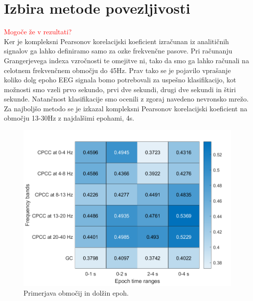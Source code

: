 \section{Izbira metode povezljivosti}
\textcolor{red}{Mogoče že v rezultati?}\\
Ker je kompleksni Pearsonov korelacijski koeficient izračunan iz analitičnih signalov ga lahko definiramo samo za ozke frekvenčne pasove. Pri računanju Grangerjevega indexa vzročnosti te omejitve ni, tako da smo ga lahko računali na celotnem frekvenčnem območju do 45Hz. Prav tako se je pojavilo vprašanje koliko dolg epoho EEG signala bomo potrebovali za uspešno klasifikacijo, kot možnosti smo vzeli prvo sekundo, prvi dve sekundi, drugi dve sekundi in štiri sekunde. Natančnost klasifikacije smo ocenili z zgoraj navedeno nevronsko mrežo. Za najboljšo metodo se je izkazal kompleksni Pearsonov korelacijski koeficient na območju 13-30Hz z najdalšimi epohami, 4s.
\begin{figure}[h!]
    \begin{center}
    \includegraphics[width=0.5\linewidth]{slike/Comparison.png}
    \end{center}
    \caption{Primerjava območij in dolžin epoh.}
\end{figure}




